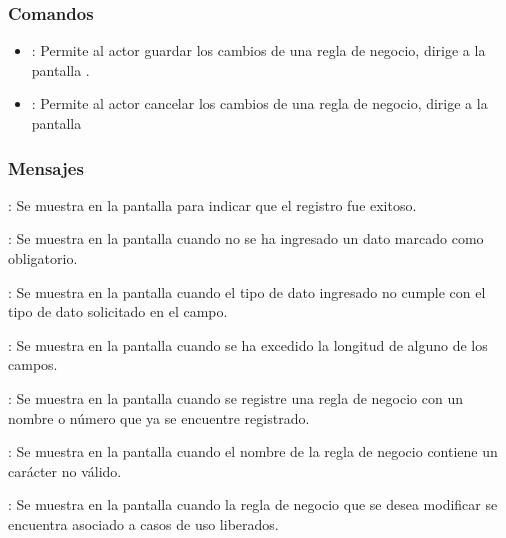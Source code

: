 \subsubsection{Comandos}
\begin{itemize}
	\item {}: Permite al actor guardar los cambios de una regla de negocio, dirige a la pantalla .
	\item {}: Permite al actor cancelar los cambios de una regla de negocio, dirige a la pantalla 
\end{itemize}

\subsubsection{Mensajes}

\begin{Citemize}
	\item {}: Se muestra en la pantalla  para indicar que el registro fue exitoso.
	\item {}: Se muestra en la pantalla  cuando no se ha ingresado un dato marcado como obligatorio.
	\item {}: Se muestra en la pantalla  cuando el tipo de dato ingresado no cumple con el tipo de dato solicitado en el campo.
	\item {}: Se muestra en la pantalla  cuando se ha excedido la longitud de alguno de los campos.
	\item {}: Se muestra en la pantalla  cuando se registre una regla de negocio con un nombre o número que ya se encuentre registrado.
	\item {}: Se muestra en la pantalla  cuando el nombre de la regla de negocio contiene un carácter no válido.
	\item {}: Se muestra en la pantalla  cuando la regla de negocio que se desea modificar se encuentra asociado a casos de uso liberados.
\end{Citemize}
